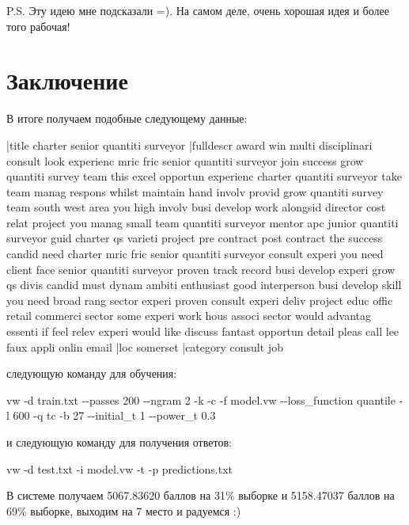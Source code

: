 \documentclass[12pt, a4paper]{article}
\begin{document}
        P.S. Эту идею мне подсказали =). На самом деле, очень хорошая идея и более того рабочая!

    \newpage
    \section{Заключение}
        В итоге получаем подобные следующему данные:

            \indent{} |title charter senior quantiti surveyor |fulldescr award win multi disciplinari consult look experienc mric fric senior quantiti surveyor join success grow quantiti survey team this excel opportun experienc charter quantiti surveyor take team manag respons whilst maintain hand involv provid grow quantiti survey team south west area you high involv busi develop work alongsid director cost relat project you manag small team quantiti surveyor mentor apc junior quantiti surveyor guid charter qs varieti project pre contract post contract the success candid need charter mric fric senior quantiti surveyor consult experi you need client face senior quantiti surveyor proven track record busi develop experi grow qs divis candid must dynam ambiti enthusiast good interperson busi develop skill you need broad rang sector experi proven consult experi deliv project educ offic retail commerci sector some experi work hous associ sector would advantag essenti if feel relev experi would like discuss fantast opportun detail pleas call lee faux appli onlin email |loc somerset |category consult job

        следующую команду для обучения:

            \indent\indent vw -d train.txt -{}-passes 200 -{}-ngram 2 -k -c -f model.vw -{}-loss\_function quantile -l 600 -q tc -b 27 -{}-initial\_t 1 -{}-power\_t 0.3

        и следующую команду для получения ответов:

            \indent\indent vw -d test.txt -i model.vw -t -p predictions.txt

        В системе получаем 5067.83620 баллов на 31\% выборке и 5158.47037 баллов на 69\% выборке, выходим на 7 место и радуемся :)
\end{document}
